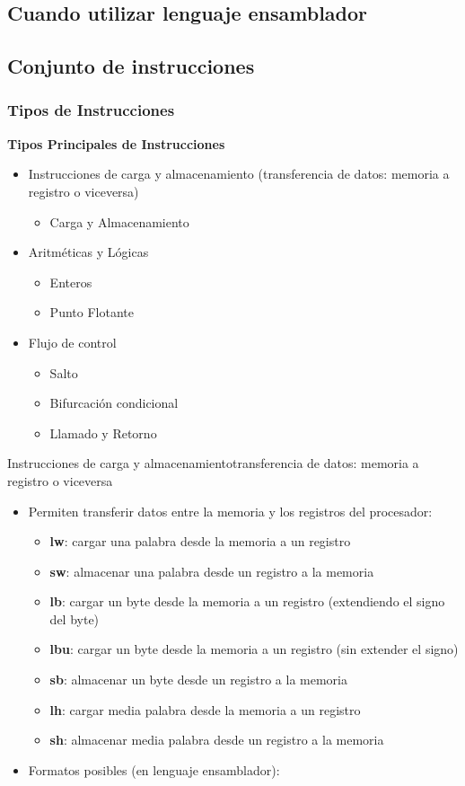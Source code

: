 \documentclass[aspectratio=169,compress]{beamer}
\begin{document}
\begin{footnotesize}
\subsection{Cuando utilizar lenguaje ensamblador}

\subsection{Conjunto de instrucciones}


\begin{frame}
\frametitle{Tipos de Instrucciones}
\begin{center}\textbf{Tipos Principales de Instrucciones}\end{center}
\begin{itemize}
\item Instrucciones de carga y almacenamiento (transferencia de datos: memoria a registro o viceversa)
\begin{itemize}
\item Carga y Almacenamiento
\end{itemize}
\item Aritméticas y Lógicas
\begin{itemize}
\item Enteros
\item Punto Flotante
\end{itemize}
\item Flujo de control
\begin{itemize}
\item Salto
\item Bifurcación condicional
\item Llamado y Retorno
\end{itemize}
\end{itemize}
\end{frame}


\begin{frame}{Instrucciones de carga y almacenamiento}{transferencia de datos: memoria a registro o viceversa}
\begin{itemize}
\item Permiten transferir datos entre la memoria y los registros del procesador:
\bigskip
\begin{itemize}
\item \textbf{lw}: cargar una palabra desde la memoria a un registro
\item \textbf{sw}: almacenar una palabra desde un registro a la memoria
\item \textbf{lb}: cargar un byte desde la memoria a un registro (extendiendo el signo del byte)
\item \textbf{lbu}: cargar un byte desde la memoria a un registro (sin extender el signo)
\item \textbf{sb}: almacenar un byte desde un registro a la memoria
\item \textbf{lh}: cargar media palabra desde la memoria a un registro
\item \textbf{sh}: almacenar media palabra desde un registro a la memoria
\end{itemize}
\bigskip
\item Formatos posibles (en lenguaje ensamblador):


\end{itemize}
\end{frame}
\end{footnotesize}
\end{document}
